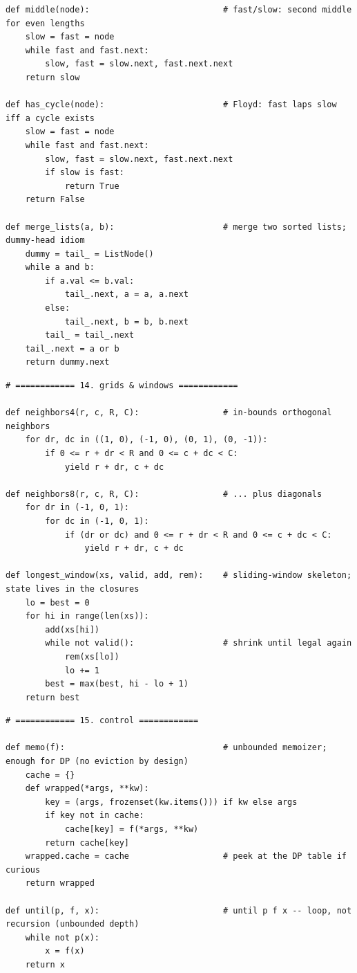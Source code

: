 \documentclass[11pt,letterpaper]{book}
\begin{document}
\begin{lstlisting}[style=code]
def middle(node):                           # fast/slow: second middle for even lengths
    slow = fast = node
    while fast and fast.next:
        slow, fast = slow.next, fast.next.next
    return slow

def has_cycle(node):                        # Floyd: fast laps slow iff a cycle exists
    slow = fast = node
    while fast and fast.next:
        slow, fast = slow.next, fast.next.next
        if slow is fast:
            return True
    return False

def merge_lists(a, b):                      # merge two sorted lists; dummy-head idiom
    dummy = tail_ = ListNode()
    while a and b:
        if a.val <= b.val:
            tail_.next, a = a, a.next
        else:
            tail_.next, b = b, b.next
        tail_ = tail_.next
    tail_.next = a or b
    return dummy.next
\end{lstlisting}
\begin{lstlisting}[style=code]
# ============ 14. grids & windows ============

def neighbors4(r, c, R, C):                 # in-bounds orthogonal neighbors
    for dr, dc in ((1, 0), (-1, 0), (0, 1), (0, -1)):
        if 0 <= r + dr < R and 0 <= c + dc < C:
            yield r + dr, c + dc

def neighbors8(r, c, R, C):                 # ... plus diagonals
    for dr in (-1, 0, 1):
        for dc in (-1, 0, 1):
            if (dr or dc) and 0 <= r + dr < R and 0 <= c + dc < C:
                yield r + dr, c + dc

def longest_window(xs, valid, add, rem):    # sliding-window skeleton; state lives in the closures
    lo = best = 0
    for hi in range(len(xs)):
        add(xs[hi])
        while not valid():                  # shrink until legal again
            rem(xs[lo])
            lo += 1
        best = max(best, hi - lo + 1)
    return best
\end{lstlisting}
\begin{lstlisting}[style=code]
# ============ 15. control ============

def memo(f):                                # unbounded memoizer; enough for DP (no eviction by design)
    cache = {}
    def wrapped(*args, **kw):
        key = (args, frozenset(kw.items())) if kw else args
        if key not in cache:
            cache[key] = f(*args, **kw)
        return cache[key]
    wrapped.cache = cache                   # peek at the DP table if curious
    return wrapped

def until(p, f, x):                         # until p f x -- loop, not recursion (unbounded depth)
    while not p(x):
        x = f(x)
    return x
\end{lstlisting}
\end{document}
